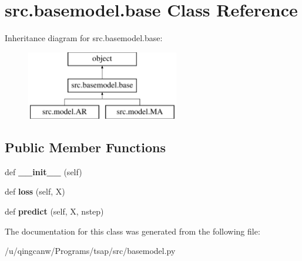 \hypertarget{classsrc_1_1basemodel_1_1base}{}\section{src.\+basemodel.\+base Class Reference}
\label{classsrc_1_1basemodel_1_1base}
Inheritance diagram for src.\+basemodel.\+base\+:\begin{figure}[H]
\begin{center}
\leavevmode
\includegraphics[height=3.000000cm]{classsrc_1_1basemodel_1_1base}
\end{center}
\end{figure}
\subsection*{Public Member Functions}
\begin{DoxyCompactItemize}
\item 
\mbox{\label{classsrc_1_1basemodel_1_1base_abecfbc88023bb6a31cac29f7d3e94bba}} 
def {\bfseries \+\_\+\+\_\+init\+\_\+\+\_\+} (self)
\item 
\mbox{\label{classsrc_1_1basemodel_1_1base_aeffdc26cfd3f8132b12841e8fb3f9ffe}} 
def {\bfseries loss} (self, X)
\item 
\mbox{\label{classsrc_1_1basemodel_1_1base_a06ef519662cbfefdd0c2760ba6b4d496}} 
def {\bfseries predict} (self, X, nstep)
\end{DoxyCompactItemize}


The documentation for this class was generated from the following file\+:\begin{DoxyCompactItemize}
\item 
/u/qingcanw/\+Programs/tsap/src/basemodel.\+py\end{DoxyCompactItemize}
